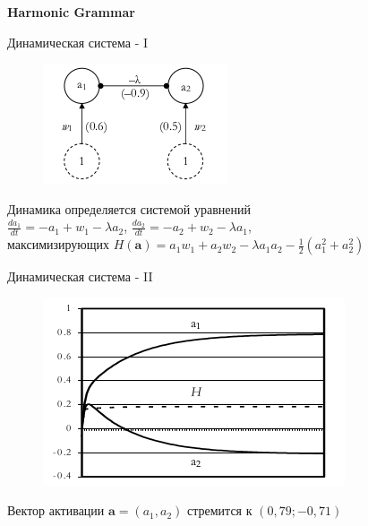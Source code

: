 \documentclass{beamer}
\begin{document}
\begin{frame}{}
\begin{center}
	\textbf{Harmonic Grammar}
\end{center}
\end{frame}

\begin{frame}{Динамическая система - I}
\begin{center}
	\begin{figure}[H]
		\includegraphics[scale=0.7]{harmonic1.png} 
	\end{figure}
\end{center}
\bigskip
Динамика определяется системой уравнений\\
\medskip
$\frac{da_1}{dt} = -a_1 + w_1 - \lambda a_2$, $\frac{da_2}{dt} = -a_2 + w_2 - \lambda a_1$,\\
\medskip
максимизирующих $H(\textbf{a}) = a_1 w_1 + a_2 w_2 - \lambda a_1 a_2 - \frac{1}{2}(a_1^2 + a_2^2)$
\end{frame}

\begin{frame}{Динамическая система - II}
\begin{center}
	\begin{figure}[H]
		\includegraphics[scale=0.7]{harmonic2.png} 
	\end{figure}
\end{center}
\bigskip
Вектор активации $\textbf{a} = (a_1, a_2)$ стремится к $(0,79; -0,71)$
\end{frame}
\end{document}
